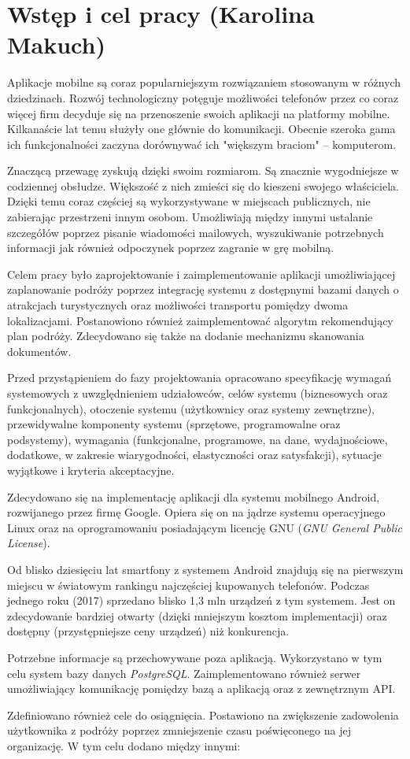 \chapter{Wstęp i cel pracy (Karolina Makuch)}
\par Aplikacje mobilne są coraz popularniejszym rozwiązaniem stosowanym w różnych dziedzinach. Rozwój technologiczny potęguje możliwości telefonów przez co coraz więcej firm decyduje się na przenoszenie swoich aplikacji na platformy mobilne. Kilkanaście lat temu  służyły one głównie do komunikacji. Obecnie szeroka gama ich funkcjonalności zaczyna dorównywać ich "większym braciom" -- komputerom.
\par Znaczącą przewagę zyskują dzięki swoim rozmiarom. Są znacznie wygodniejsze w codziennej obsłudze. Większość z nich zmieści się do kieszeni swojego właściciela. Dzięki temu coraz częściej są wykorzystywane w miejscach publicznych, nie zabierając przestrzeni innym osobom. Umożliwiają między innymi ustalanie szczegółów poprzez pisanie wiadomości mailowych, wyszukiwanie potrzebnych informacji jak również odpoczynek poprzez zagranie w grę mobilną.
\par Celem pracy było zaprojektowanie i zaimplementowanie aplikacji umożliwiającej zaplanowanie podróży poprzez integrację systemu z dostępnymi bazami danych o atrakcjach turystycznych oraz możliwości transportu pomiędzy dwoma lokalizacjami. Postanowiono również zaimplementować algorytm rekomendujący plan podróży. Zdecydowano się także na dodanie mechanizmu skanowania dokumentów. 
\par Przed przystąpieniem do fazy projektowania opracowano specyfikację wymagań systemowych z uwzględnieniem udziałowców, celów systemu (biznesowych oraz funkcjonalnych), otoczenie systemu (użytkownicy oraz systemy zewnętrzne), przewidywalne komponenty systemu (sprzętowe, programowalne oraz podsystemy), wymagania (funkcjonalne, programowe, na dane, wydajnościowe, dodatkowe, w zakresie wiarygodności, elastyczności oraz satysfakcji), sytuacje wyjątkowe i kryteria akceptacyjne.
\par Zdecydowano się na implementację aplikacji dla systemu mobilnego Android, rozwijanego przez firmę Google. Opiera się on na jądrze systemu operacyjnego Linux oraz na oprogramowaniu posiadającym licencję GNU (\textit{GNU General Public License}).
 \par Od blisko dziesięciu lat smartfony z systemem Android znajdują się na pierwszym miejscu w światowym rankingu najczęściej kupowanych telefonów. Podczas jednego roku (2017) sprzedano blisko 1,3 mln urządzeń z tym systemem. Jest on zdecydowanie bardziej otwarty (dzięki mniejszym kosztom implementacji) oraz dostępny (przystępniejsze ceny urządzeń) niż konkurencja.
\par Potrzebne informacje są przechowywane poza aplikacją. Wykorzystano w tym celu system bazy danych \textit{PostgreSQL}. Zaimplementowano również serwer umożliwiający komunikację pomiędzy bazą a aplikacją oraz z zewnętrznym API.
\par Zdefiniowano również cele do osiągnięcia. Postawiono na zwiększenie zadowolenia użytkownika z podróży poprzez zmniejszenie czasu poświęconego na jej organizację. W tym celu dodano między innymi:

